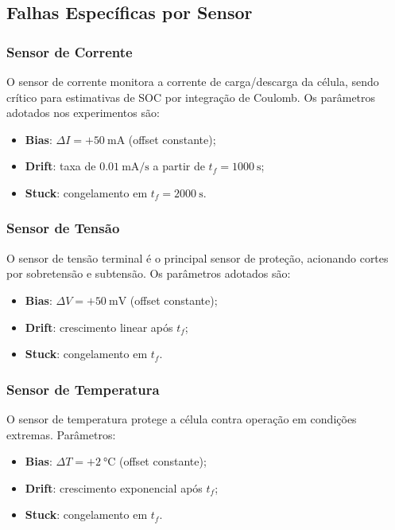 \documentclass[
    12pt,
    openright,
    twoside,
    a4paper,
    brazil,
    english
]{abntex2}
\begin{document}
\subsection{Falhas Específicas por Sensor}

\subsubsection{Sensor de Corrente}

O sensor de corrente monitora a corrente de carga/descarga da célula, sendo
crítico para estimativas de SOC por integração de Coulomb. Os parâmetros
adotados nos experimentos são:
\begin{itemize}
  \item \textbf{Bias}: $\Delta I = +\SI{50}{\milli\ampere}$ (offset constante);
  \item \textbf{Drift}: taxa de $\SI{0.01}{\milli\ampere\per\second}$ a partir
        de $t_f = \SI{1000}{\second}$;
  \item \textbf{Stuck}: congelamento em $t_f = \SI{2000}{\second}$.
\end{itemize}

\subsubsection{Sensor de Tensão}

O sensor de tensão terminal é o principal sensor de proteção, acionando
cortes por sobretensão e subtensão. Os parâmetros adotados são:
\begin{itemize}
  \item \textbf{Bias}: $\Delta V = +\SI{50}{\milli\volt}$ (offset constante);
  \item \textbf{Drift}: crescimento linear após $t_f$;
  \item \textbf{Stuck}: congelamento em $t_f$.
\end{itemize}

\subsubsection{Sensor de Temperatura}

O sensor de temperatura protege a célula contra operação em condições extremas.
Parâmetros:
\begin{itemize}
  \item \textbf{Bias}: $\Delta T = +\SI{2}{\celsius}$ (offset constante);
  \item \textbf{Drift}: crescimento exponencial após $t_f$;
  \item \textbf{Stuck}: congelamento em $t_f$.
\end{itemize}
\end{document}
